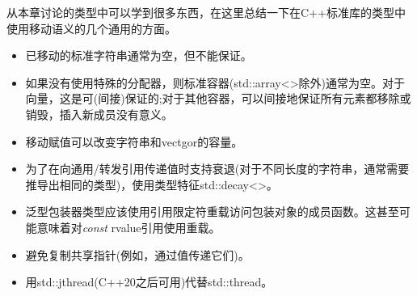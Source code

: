 从本章讨论的类型中可以学到很多东西，在这里总结一下在C++标准库的类型中使用移动语义的几个通用的方面。

\begin{itemize}
	\item 已移动的标准字符串通常为空，但不能保证。
	\item 如果没有使用特殊的分配器，则标准容器(std::array<>除外)通常为空。对于向量，这是可(间接)保证的;对于其他容器，可以间接地保证所有元素都移除或销毁，插入新成员没有意义。
	\item 移动赋值可以改变字符串和vectgor的容量。
	\item 为了在向通用/转发引用传递值时支持衰退(对于不同长度的字符串，通常需要推导出相同的类型)，使用类型特征std::decay<>。
	\item 泛型包装器类型应该使用引用限定符重载访问包装对象的成员函数。这甚至可能意味着对\textit{const} rvalue引用使用重载。
	\item 避免复制共享指针(例如，通过值传递它们)。
	\item 用std::jthread(C++20之后可用)代替std::thread。
\end{itemize}


